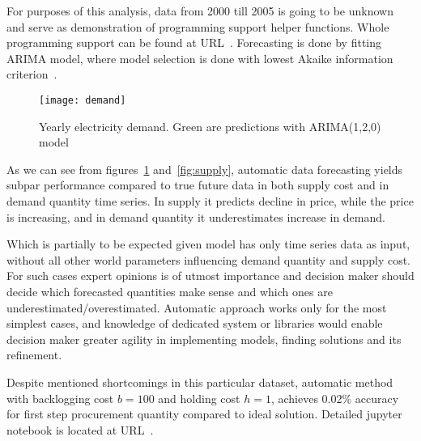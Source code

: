 For purposes of this analysis, data from 2000 till 2005 is going to be unknown and serve as demonstration of programming support helper functions. Whole programming support can be found at URL~\autocite{code}. Forecasting is done by fitting ARIMA model, where model selection is done with lowest Akaike information criterion~\autocite{Akaike1974}.

\begin{figure}[]
  \centering
  \texttt{[image: demand]}
  \caption{Yearly electricity demand. Green are predictions with ARIMA(1,2,0) model}
  \label{fig:demand}
\end{figure}

As we can see from figures~\ref{fig:demand} and~\ref{fig:supply}, automatic data forecasting yields subpar performance compared to true future data in both supply cost and in demand quantity time series. In supply it predicts decline in price, while the price is increasing, and in demand quantity it underestimates increase in demand.

Which is partially to be expected given model has only time series data as input, without all other world parameters influencing demand quantity and supply cost. For such cases expert opinions is of utmost importance and decision maker should decide which forecasted quantities make sense and which ones are underestimated/overestimated. Automatic approach works only for the most simplest cases, and knowledge of dedicated system or libraries would enable decision maker greater agility in implementing models, finding solutions and its refinement.

Despite mentioned shortcomings in this particular dataset, automatic method with backlogging cost $b=100$ and holding cost $h=1$, achieves 0.02\% accuracy for first step procurement quantity compared to ideal solution. Detailed jupyter notebook is located at URL~\autocite{jup}.
